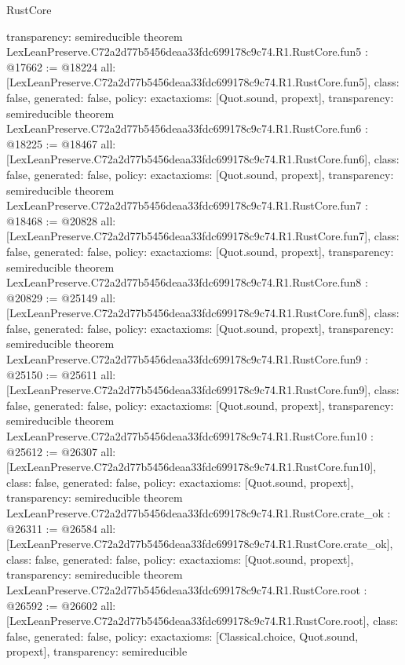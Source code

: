 \begin{lexlean}{RustCore}
\begin{coremodule}
{  transparency: semireducible
}
theorem LexLeanPreserve.C72a2d77b5456deaa33fdc699178c9c74.R1.RustCore.fun5 : @17662 := @18224 {
  all: [LexLeanPreserve.C72a2d77b5456deaa33fdc699178c9c74.R1.RustCore.fun5],
  class: false,
  generated: false,
  policy: exact{axioms: [Quot.sound, propext]},
  transparency: semireducible
}
theorem LexLeanPreserve.C72a2d77b5456deaa33fdc699178c9c74.R1.RustCore.fun6 : @18225 := @18467 {
  all: [LexLeanPreserve.C72a2d77b5456deaa33fdc699178c9c74.R1.RustCore.fun6],
  class: false,
  generated: false,
  policy: exact{axioms: [Quot.sound, propext]},
  transparency: semireducible
}
theorem LexLeanPreserve.C72a2d77b5456deaa33fdc699178c9c74.R1.RustCore.fun7 : @18468 := @20828 {
  all: [LexLeanPreserve.C72a2d77b5456deaa33fdc699178c9c74.R1.RustCore.fun7],
  class: false,
  generated: false,
  policy: exact{axioms: [Quot.sound, propext]},
  transparency: semireducible
}
theorem LexLeanPreserve.C72a2d77b5456deaa33fdc699178c9c74.R1.RustCore.fun8 : @20829 := @25149 {
  all: [LexLeanPreserve.C72a2d77b5456deaa33fdc699178c9c74.R1.RustCore.fun8],
  class: false,
  generated: false,
  policy: exact{axioms: [Quot.sound, propext]},
  transparency: semireducible
}
theorem LexLeanPreserve.C72a2d77b5456deaa33fdc699178c9c74.R1.RustCore.fun9 : @25150 := @25611 {
  all: [LexLeanPreserve.C72a2d77b5456deaa33fdc699178c9c74.R1.RustCore.fun9],
  class: false,
  generated: false,
  policy: exact{axioms: [Quot.sound, propext]},
  transparency: semireducible
}
theorem LexLeanPreserve.C72a2d77b5456deaa33fdc699178c9c74.R1.RustCore.fun10 : @25612 := @26307 {
  all: [LexLeanPreserve.C72a2d77b5456deaa33fdc699178c9c74.R1.RustCore.fun10],
  class: false,
  generated: false,
  policy: exact{axioms: [Quot.sound, propext]},
  transparency: semireducible
}
theorem LexLeanPreserve.C72a2d77b5456deaa33fdc699178c9c74.R1.RustCore.crate_ok : @26311 := @26584 {
  all: [LexLeanPreserve.C72a2d77b5456deaa33fdc699178c9c74.R1.RustCore.crate_ok],
  class: false,
  generated: false,
  policy: exact{axioms: [Quot.sound, propext]},
  transparency: semireducible
}
theorem LexLeanPreserve.C72a2d77b5456deaa33fdc699178c9c74.R1.RustCore.root : @26592 := @26602 {
  all: [LexLeanPreserve.C72a2d77b5456deaa33fdc699178c9c74.R1.RustCore.root],
  class: false,
  generated: false,
  policy: exact{axioms: [Classical.choice, Quot.sound, propext]},
  transparency: semireducible
}


\end{coremodule}
\end{lexlean}

